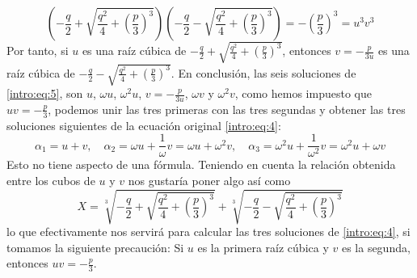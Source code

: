 $$\left(-\frac{q}{2}+\sqrt{\frac{q^2}{4}+\left(\frac{p}{3}\right)^3}\right)\left(-\frac{q}{2}-\sqrt{\frac{q^2}{4}+\left(\frac{p}{3}\right)^3}\right)=-\left(\frac{p}{3}\right)^3=u^3v^3$$
Por tanto, si $u$ es una raíz cúbica de $-\frac{q}{2}+\sqrt{\frac{q^2}{4}+\left(\frac{p}{3}\right)^3}$, entonces $v=-\frac{p}{3u}$ es una raíz cúbica de $-\frac{q}{2}-\sqrt{\frac{q^2}{4}+\left(\frac{p}{3}\right)^3}$. En conclusión, las seis soluciones de \ref{intro:eq:5}, son $u$, $\omega u$, $\omega^2 u$, $v=-\frac{p}{3u}$, $\omega v$ y $\omega^2 v$, como hemos impuesto que $uv=-\frac{p}{3}$, podemos unir las tres primeras con las tres segundas y obtener las tres soluciones siguientes de la ecuación original \ref{intro:eq:4}:
$$\alpha_1=u+v, \quad \alpha_2=\omega u +\frac{1}{\omega}v=\omega u + \omega^2v, \quad \alpha_3=\omega^2 u + \frac{1}{\omega^2}v=\omega^2 u +\omega v$$
Esto no tiene aspecto de una fórmula. Teniendo en cuenta la relación obtenida entre los cubos de $u$ y $v$ nos gustaría poner algo así como
$$X=\sqrt[3]{-\frac{q}{2}+\sqrt{\frac{q^2}{4}+\left(\frac{p}{3}\right)^3}} + \sqrt[3]{-\frac{q}{2}-\sqrt{\frac{q^2}{4}+\left(\frac{p}{3}\right)^3}}$$
lo que efectivamente nos servirá para calcular las tres soluciones de \ref{intro:eq:4}, si tomamos la siguiente precaución: Si $u$ es la primera raíz cúbica y $v$ es la segunda, entonces $uv=-\frac{p}{3}$.


